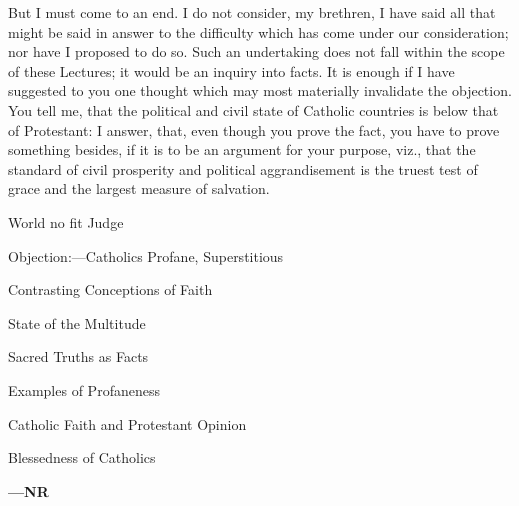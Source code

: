 But I must come to an end. I do not consider, my brethren, I have
said all that might be said in answer to the difficulty which has come
under our consideration; nor have I proposed to do so. Such an
undertaking does not fall within the scope of these Lectures; it would
be an inquiry into facts. It is enough if I have suggested to you one
thought which may most materially invalidate the objection. You tell
me, that the political and civil state of Catholic countries is below
that of Protestant: I answer, that, even though you prove the fact,
you have to prove something besides, if it is to be an argument for
your purpose, viz., that the standard of civil prosperity and
political aggrandisement is the truest test of grace and the largest
measure of salvation.


World no fit Judge

Objection:—Catholics Profane,
Superstitious

Contrasting Conceptions of Faith

State of the Multitude

Sacred Truths as Facts

Examples of Profaneness

Catholic Faith and Protestant Opinion

Blessedness of Catholics

\textbf{—NR}

